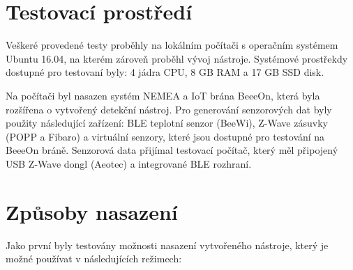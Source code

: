 
\section{Testovací prostředí}
Veškeré provedené testy proběhly na lokálním počítači s operačním systémem Ubuntu 16.04,
na kterém zároveň proběhl vývoj nástroje. Systémové
prostřekdy dostupné pro testovaní byly: 4 jádra CPU, 8 GB RAM a 17 GB SSD disk.

Na počítači byl nasazen systém NEMEA a IoT brána BeeeOn, která byla rozšířena o vytvořený detekční 
nástroj. Pro generování senzorových dat byly použity následující zařízení: BLE teplotní senzor (BeeWi), 
Z-Wave zásuvky (POPP a Fibaro) a virtuální senzory, které jsou dostupné pro testování na BeeeOn bráně.
Senzorová data přijímal testovací počítač, který měl připojený USB Z-Wave dongl (Aeotec) a integrované
BLE rozhraní.

\section{Způsoby nasazení}
Jako první byly testovány možnosti nasazení vytvořeného nástroje, který je možné používat v 
následujících režimech:

